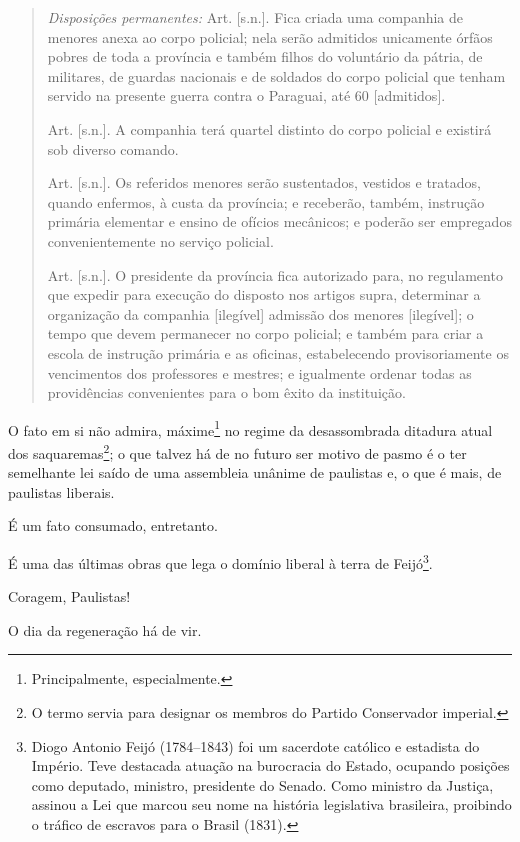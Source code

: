\begin{quote}
\emph{Disposições permanentes:} Art. {[}s.n.{]}. Fica criada uma
companhia de menores anexa ao corpo policial; nela serão admitidos
unicamente órfãos pobres de toda a província e também filhos do
voluntário da pátria, de militares, de guardas nacionais e de soldados
do corpo policial que tenham servido na presente guerra contra o
Paraguai, até 60 {[}admitidos{]}.

Art. {[}s.n.{]}. A companhia terá quartel distinto do corpo policial e
existirá sob diverso comando.

Art. {[}s.n.{]}. Os referidos menores serão sustentados, vestidos e
tratados, quando enfermos, à custa da província; e receberão, também,
instrução primária elementar e ensino de ofícios mecânicos; e poderão
ser empregados convenientemente no serviço policial.

Art. {[}s.n.{]}. O presidente da província fica autorizado para, no
regulamento que expedir para execução do disposto nos artigos supra,
determinar a organização da companhia {[}ilegível{]} admissão dos
menores {[}ilegível{]}; o tempo que devem permanecer no corpo policial;
e também para criar a escola de instrução primária e as oficinas,
estabelecendo provisoriamente os vencimentos dos professores e mestres;
e igualmente ordenar todas as providências convenientes para o bom êxito
da instituição.
\end{quote}

O fato em si não admira, máxime\footnote{Principalmente,
  especialmente.} no regime da desassombrada ditadura atual dos
saquaremas\footnote{O termo servia para designar os membros do Partido
  Conservador imperial.}; o que talvez há de no futuro ser motivo de
pasmo é o ter semelhante lei saído de uma assembleia unânime de
paulistas e, o que é mais, de paulistas liberais.

É um fato consumado, entretanto.

É uma das últimas obras que lega o domínio liberal à terra de
Feijó\footnote{Diogo Antonio Feijó (1784--1843) foi um sacerdote
  católico e estadista do Império. Teve destacada atuação na burocracia
  do Estado, ocupando posições como deputado, ministro, presidente do
  Senado. Como ministro da Justiça, assinou a Lei que marcou seu nome na
  história legislativa brasileira, proibindo o tráfico de escravos para
  o Brasil (1831).}.

Coragem, Paulistas!

O dia da regeneração há de vir.

